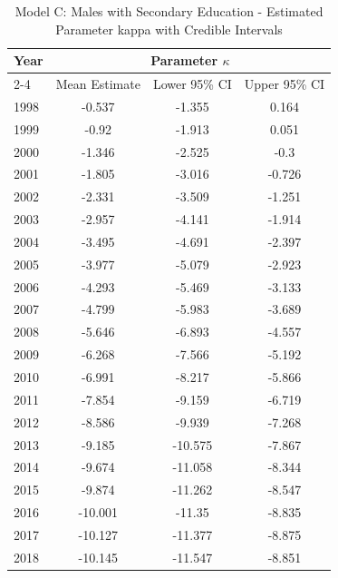 \begin{landscape}
\begin{table}[htbp]
\centering
\caption{Model C: Males with Secondary Education - Estimated Parameter kappa  with Credible Intervals}
\label{tab:parameters_k23}
\begin{tabular}{@{}lccc@{}}
\toprule
Year & \multicolumn{3}{c}{Parameter \(\kappa\)} \\
\cmidrule(lr){2-4}
      & Mean Estimate & Lower 95\% CI & Upper 95\% CI \\
\midrule
1998 & -0.537 & -1.355 & 0.164 \\
1999 & -0.92 & -1.913 & 0.051 \\
2000 & -1.346 & -2.525 & -0.3 \\
2001 & -1.805 & -3.016 & -0.726 \\
2002 & -2.331 & -3.509 & -1.251 \\
2003 & -2.957 & -4.141 & -1.914 \\
2004 & -3.495 & -4.691 & -2.397 \\
2005 & -3.977 & -5.079 & -2.923 \\
2006 & -4.293 & -5.469 & -3.133 \\
2007 & -4.799 & -5.983 & -3.689 \\
2008 & -5.646 & -6.893 & -4.557 \\
2009 & -6.268 & -7.566 & -5.192 \\
2010 & -6.991 & -8.217 & -5.866 \\
2011 & -7.854 & -9.159 & -6.719 \\
2012 & -8.586 & -9.939 & -7.268 \\
2013 & -9.185 & -10.575 & -7.867 \\
2014 & -9.674 & -11.058 & -8.344 \\
2015 & -9.874 & -11.262 & -8.547 \\
2016 & -10.001 & -11.35 & -8.835 \\
2017 & -10.127 & -11.377 & -8.875 \\
2018 & -10.145 & -11.547 & -8.851 \\
\bottomrule
\end{tabular}
\end{table}
\end{landscape}